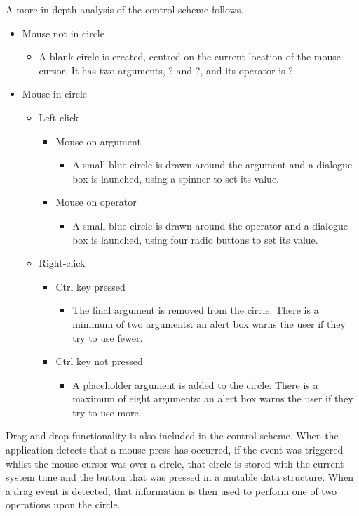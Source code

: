 \documentclass[12pt,twoside,notitlepage,xetex]{report}
\begin{document}
{A more in-depth analysis of the control scheme follows.

\begin{itemize}
\item Mouse not in circle
\begin{itemize}
\item A blank circle is created, centred on the current location of the mouse cursor.  It has two arguments, {\sfapp ?} and {\sfapp ?}, and its operator is {\sfapp ?}.
\end{itemize}
\item Mouse in circle
\begin{itemize}
\item Left-click
\begin{itemize}
\item Mouse on argument
\begin{itemize}
\item A small blue circle is drawn around the argument and a dialogue box is launched, using a spinner to set its value.
\end{itemize}
\item Mouse on operator
\begin{itemize}
\item A small blue circle is drawn around the operator and a dialogue box is launched, using four radio buttons to set its value.
\end{itemize}
\end{itemize}
\item Right-click
\begin{itemize}
\item Ctrl key pressed
\begin{itemize}
\item The final argument is removed from the circle.  There is a minimum of two arguments: an alert box warns the user if they try to use fewer.
\end{itemize}
\item Ctrl key not pressed
\begin{itemize}
\item A placeholder argument is added to the circle.  There is a maximum of eight arguments: an alert box warns the user if they try to use more.
\end{itemize}
\end{itemize}
\end{itemize}
\end{itemize}

Drag-and-drop functionality is also included in the control scheme.  When the application detects that a mouse press has occurred, if the event was triggered whilst the mouse cursor was over a circle, that circle is stored with the current system time and the button that was pressed in a mutable data structure.  When a drag event is detected, that information is then used to perform one of two operations upon the circle.

}
\end{document}

